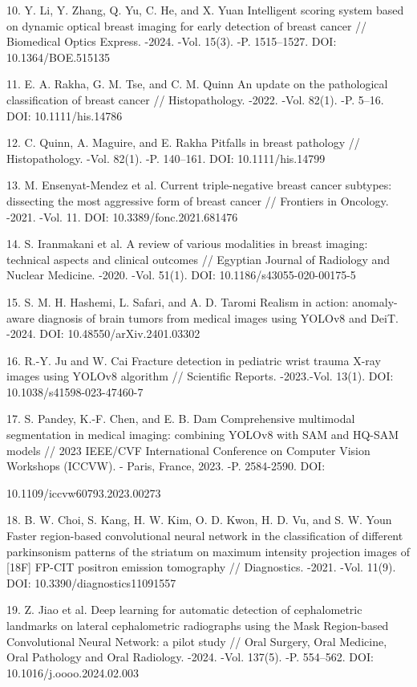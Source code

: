 \begin{references}
10. Y. Li, Y. Zhang, Q. Yu, C. He, and X. Yuan Intelligent scoring
system based on dynamic optical breast imaging for early detection of
breast cancer // Biomedical Optics Express. -2024. -Vol. 15(3). -P.
1515--1527. DOI: 10.1364/BOE.515135

11. E. A. Rakha, G. M. Tse, and C. M. Quinn An update on the
pathological classification of breast cancer // Histopathology. -2022.
-Vol. 82(1). -P. 5--16. DOI: 10.1111/his.14786

12. C. Quinn, A. Maguire, and E. Rakha Pitfalls in breast pathology //
Histopathology. -Vol. 82(1). -P. 140--161. DOI: 10.1111/his.14799

13. M. Ensenyat-Mendez et al. Current triple-negative breast cancer
subtypes: dissecting the most aggressive form of breast cancer //
Frontiers in Oncology. -2021. -Vol. 11. DOI: 10.3389/fonc.2021.681476

14. S. Iranmakani et al. A review of various modalities in breast
imaging: technical aspects and clinical outcomes // Egyptian Journal of
Radiology and Nuclear Medicine. -2020. -Vol. 51(1). DOI:
10.1186/s43055-020-00175-5

15. S. M. H. Hashemi, L. Safari, and A. D. Taromi Realism in action:
anomaly-aware diagnosis of brain tumors from medical images using YOLOv8
and DeiT. -2024. DOI: 10.48550/arXiv.2401.03302

16. R.-Y. Ju and W. Cai Fracture detection in pediatric wrist trauma
X-ray images using YOLOv8 algorithm // Scientific Reports. -2023.-Vol.
13(1). DOI: 10.1038/s41598-023-47460-7

17. S. Pandey, K.-F. Chen, and E. B. Dam Comprehensive multimodal
segmentation in medical imaging: combining YOLOv8 with SAM and HQ-SAM
models // 2023 IEEE/CVF International Conference on Computer Vision
Workshops (ICCVW). - Paris, France, 2023. -P. 2584-2590. DOI:

10.1109/iccvw60793.2023.00273

18. B. W. Choi, S. Kang, H. W. Kim, O. D. Kwon, H. D. Vu, and S. W. Youn
Faster region-based convolutional neural network in the classification
of different parkinsonism patterns of the striatum on maximum intensity
projection images of {[}18F{]} FP-CIT positron emission tomography //
Diagnostics. -2021. -Vol. 11(9). DOI: 10.3390/diagnostics11091557

19. Z. Jiao et al. Deep learning for automatic detection of
cephalometric landmarks on lateral cephalometric radiographs using the
Mask Region-based Convolutional Neural Network: a pilot study // Oral
Surgery, Oral Medicine, Oral Pathology and Oral Radiology. -2024. -Vol.
137(5). -P. 554--562. DOI: \\10.1016/j.oooo.2024.02.003


\end{references}
